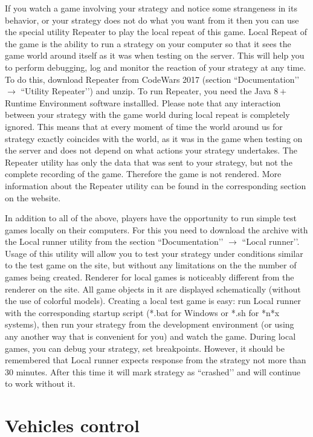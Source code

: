 If you watch a game involving your strategy and notice some strangeness in its behavior, or your strategy does not do what you want from it
then you can use the special utility Repeater to play the local repeat of this game. Local Repeat
of the game is the ability to run a strategy on your computer so that it sees the game world around itself as it was when
testing on the server. This will help you to perform debugging, log and monitor the reaction of your strategy at any time. To do this, download Repeater from CodeWars 2017 (section ``Documentation’’ $\rightarrow$ ``Utility Repeater’’) and unzip.
To run Repeater, you need the Java $8+$ Runtime Environment software installled. Please note that any interaction between your
strategy with the game world during local repeat is completely ignored. This means that at every moment of time the world around us
for strategy exactly coincides with the world, as it was in the game when testing on the server and does not depend on what actions your strategy
undertakes. The Repeater utility has only the data that was sent to your strategy, but not the complete recording of the game. Therefore
the game is not rendered. More information about the Repeater utility can be found in the corresponding section on the website.

In addition to all of the above, players have the opportunity to run simple test games locally on their computers. For this
you need to download the archive with the Local runner utility from the section ``Documentation’’ $\rightarrow $ ``Local runner’’. Usage of this
utility will allow you to test your strategy under conditions similar to the test game on the site, but without any limitations on the
the number of games being created. Renderer for local games is noticeably different from the renderer on the site. 
All game objects in it are displayed
schematically (without the use of colorful models). Creating a local test game is easy: run Local runner with
the corresponding startup script (*.bat for Windows or *.sh for *n*x systems), then run your strategy from the development environment (or using any another way that is convenient for you) and watch the game. During local games, you can debug your strategy, set breakpoints.
However, it should be remembered that Local runner expects response from the strategy not more than $30$ minutes. After this time it will mark
strategy as ``crashed’’ and will continue to work without it.

\section{Vehicles control}

